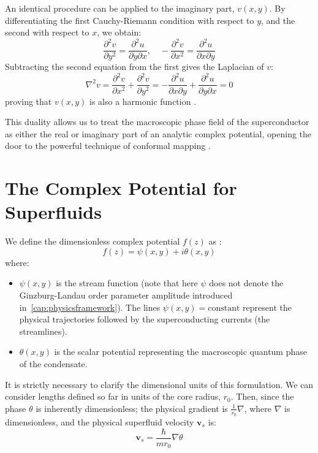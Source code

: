 \documentclass[english,binding=0.6cm,noexaminfo]{sapthesis}
\begin{document}
An identical procedure can be applied to the imaginary part, $v(x,y)$. By differentiating the first Cauchy-Riemann condition with respect to $y$, and the second with respect to $x$, we obtain:
\begin{equation}
    \frac{\partial^2 v}{\partial y^2} = \frac{\partial^2 u}{\partial y \partial x}, \quad -\frac{\partial^2 v}{\partial x^2} = \frac{\partial^2 u}{\partial x \partial y}
\end{equation}
Subtracting the second equation from the first gives the Laplacian of $v$:
\begin{equation}
    \nabla^2 v = \frac{\partial^2 v}{\partial x^2} + \frac{\partial^2 v}{\partial y^2} = -\frac{\partial^2 u}{\partial x \partial y} + \frac{\partial^2 u}{\partial y \partial x} = 0
\end{equation}
proving that $v(x,y)$ is also a harmonic function \cite{brown2013complex}. 

This duality allows us to treat the macroscopic phase field of the superconductor as either the real or imaginary part of an analytic complex potential, opening the door to the powerful technique of conformal mapping \cite{clem2011geometry}.

\section{The Complex Potential for Superfluids}
We define the dimensionless complex potential $f(z)$ as \cite{kogan2014manipulating}:
\begin{equation}
    f(z) = \psi(x,y) + i\theta(x,y)
\end{equation}
where:
\begin{itemize}
    \item $\psi(x,y)$ is the stream function (note that here $\psi$ does not denote the Ginzburg-Landau order parameter amplitude introduced in~\ref{cap:physicsframework}). The lines $\psi(x,y) = \text{constant}$ represent the physical trajectories followed by the superconducting currents (the streamlines).
    \item $\theta(x,y)$ is the scalar potential representing the macroscopic quantum phase of the condensate.
\end{itemize}

It is strictly necessary to clarify the dimensional units of this formulation.  We can consider lengths defined so far in units of the core radius, $r_0$.  Then, since the phase $\theta$ is inherently dimensionless; the physical gradient is $\frac{1}{r_0}\nabla $, where $\nabla$ is dimensionless, and the physical superfluid velocity $\mathbf{v}_s$ is:
\begin{equation}
    \mathbf{v}_s = \frac{\hbar}{m r_0} \nabla \theta
\end{equation}
\end{document}
